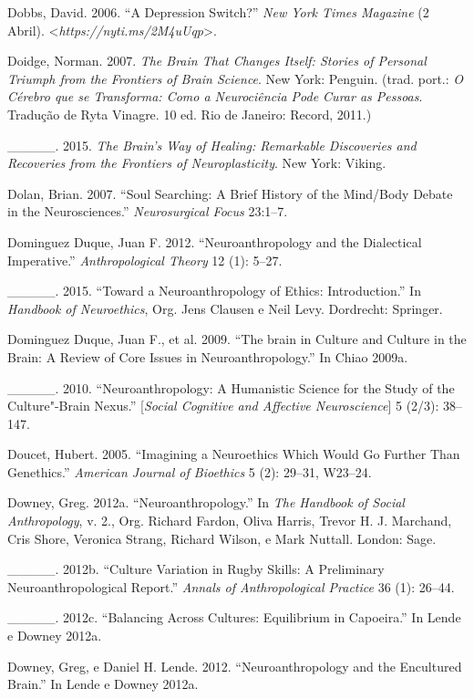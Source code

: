 {\begin{Parskip}
Dobbs, David. 2006. ``A Depression Switch?'' \emph{New York Times
Magazine} (2 Abril).
\textless{}\emph{https://nyti.ms/2M4uUqp}\textgreater{}.

Doidge, Norman. 2007. \emph{The Brain That Changes Itself: Stories of
Personal Triumph from the Frontiers of Brain Science}. New York:
Penguin. (trad. port.: \emph{O Cérebro que se Transforma: Como a
Neurociência Pode Curar as Pessoas}. Tradução de Ryta Vinagre. 10 ed.
Rio de Janeiro: Record, 2011.)

\_\_\_\_\_. 2015. \emph{The Brain's Way of Healing: Remarkable
Discoveries and Recoveries from the Frontiers of Neuroplasticity}. New
York: Viking.

Dolan, Brian. 2007. ``Soul Searching: A Brief History of the Mind/Body
Debate in the Neurosciences.'' \emph{Neurosurgical Focus} 23:1--7.

Dominguez Duque, Juan F. 2012. ``Neuroanthropology and the Dialectical
Imperative.'' \emph{Anthropological Theory} 12 (1): 5--27.

\_\_\_\_\_. 2015. ``Toward a Neuroanthropology of Ethics: Introduction.''
In \emph{Handbook of Neuroethics}, Org. Jens Clausen e Neil Levy.
Dordrecht: Springer.

Dominguez Duque, Juan F., et al. 2009. ``The brain in Culture and
Culture in the Brain: A Review of Core Issues in Neuroanthropology.'' In
Chiao 2009a.

\_\_\_\_\_. 2010. ``Neuroanthropology: A Humanistic Science for the Study
of the Culture"-Brain Nexus.'' \emph{} {[}\emph{Social Cognitive and
Affective Neuroscience}{]} 5 (2/3): 38--147.

Doucet, Hubert. 2005. ``Imagining a Neuroethics Which Would Go Further
Than Genethics.'' \emph{American Journal of Bioethics} 5 (2): 29--31,
W23--24.

Downey, Greg. 2012a. ``Neuroanthropology.'' In \emph{The  Handbook
of Social Anthropology}, v. 2., Org. Richard Fardon, Oliva Harris,
Trevor H. J. Marchand, Cris Shore, Veronica Strang, Richard Wilson, e
Mark Nuttall. London: Sage.

\_\_\_\_\_. 2012b. ``Culture Variation in Rugby Skills: A Preliminary
Neuroanthropological Report.'' \emph{Annals of Anthropological Practice}
36 (1): 26--44.

\_\_\_\_\_. 2012c. ``Balancing Across Cultures: Equilibrium in
Capoeira.'' In Lende e Downey 2012a.

Downey, Greg, e Daniel H. Lende. 2012. ``Neuroanthropology and the
Encultured Brain.'' In Lende e Downey 2012a.


\end{Parskip}}

